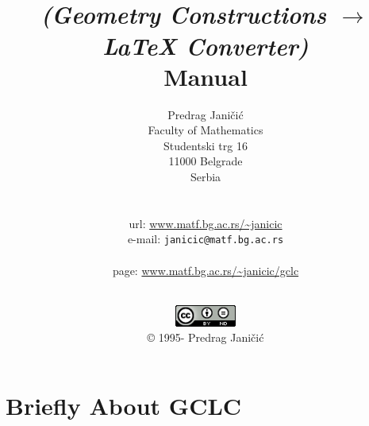 \documentclass[a4paper]{book}
\title{\gclc \number \year{} \\
{\it (Geometry Constructions $\rightarrow$ \LaTeX{} Converter)} \\
{\bf Manual}}
\author{Predrag Janičić \\
Faculty of Mathematics \\
Studentski trg 16 \\
11000 Belgrade \\
Serbia \\ \\ \\
{\sc url}:  \url{www.matf.bg.ac.rs/~janicic} \\
e-mail:  {\tt janicic@matf.bg.ac.rs} \\ \\
\gclc page:  \url{www.matf.bg.ac.rs/~janicic/gclc}}
\date{\todayMonth{} \number \year \\ \vspace*{7cm}
\includegraphics[width=0.15\textwidth]{figures/CC-BY-ND.png} \\ 
\copyright{} 1995-\number \year {} Predrag Janičić}
\newcommand{\gclc}{{\bfseries GCLC}\xspace}
\begin{document}
\maketitle

\tableofcontents

\pagestyle{fancyplain}
\renewcommand{\chaptermark}[1]{\markboth{\thechapter\ #1}{#1}}
\renewcommand{\sectionmark}[1]{\markright{\thesection\ #1}}
\lhead[\fancyplain{}{\bfseries\slshape\thepage}]{\fancyplain{}{\bfseries\slshape\rightmark}}
\rhead[\fancyplain{}{\bfseries\slshape\leftmark}]{\fancyplain{}{\bfseries\slshape\thepage}}
\cfoot{}


\chapter{Briefly About \gclc}
\end{document}
